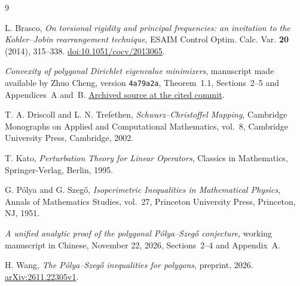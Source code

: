 \documentclass[11pt,a4paper,reqno]{amsart}
\theoremstyle{remark}
\numberwithin{equation}{section}
\begin{document}
\enlargethispage{1.5\baselineskip}
\begin{thebibliography}{9}

L. Brasco, \emph{On torsional rigidity and principal frequencies: an
invitation to the Kohler--Jobin rearrangement technique},
ESAIM Control Optim. Calc. Var. \textbf{20} (2014), 315--338.
\href{https://doi.org/10.1051/cocv/2013065}{doi:10.1051/cocv/2013065}.

\emph{Convexity of polygonal Dirichlet eigenvalue minimizers}, manuscript
made available by Zhuo Cheng, version \texttt{4a79a2a}, Theorem~1.1,
Sections~2--5 and Appendices~A and~B.
\href{https://github.com/ChengZhuoCZ/polygonal-faber-krahn-convexity/blob/4a79a2ae9a56d9274503b1f099634a6db8e19ffe/convexity_polygonal_minimizers_global.tex}{Archived source at the cited commit}.

T. A. Driscoll and L. N. Trefethen, \emph{Schwarz--Christoffel Mapping},
Cambridge Monographs on Applied and Computational Mathematics, vol.~8,
Cambridge University Press, Cambridge, 2002.

T. Kato, \emph{Perturbation Theory for Linear Operators}, Classics in
Mathematics, Springer-Verlag, Berlin, 1995.

G. P\'olya and G. Szeg\H{o}, \emph{Isoperimetric Inequalities in Mathematical
Physics}, Annals of Mathematics Studies, vol.~27, Princeton University
Press, Princeton, NJ, 1951.

\emph{A unified analytic proof of the polygonal P\'olya--Szeg\H{o}
conjecture}, working manuscript in Chinese, November 22, 2026, Sections~2--4
and Appendix~A.

H. Wang, \emph{The P\'olya--Szeg\H{o} inequalities for polygons}, preprint,
2026. \href{https://arxiv.org/abs/2611.22305v1}{arXiv:2611.22305v1}.

\end{thebibliography}
\end{document}
